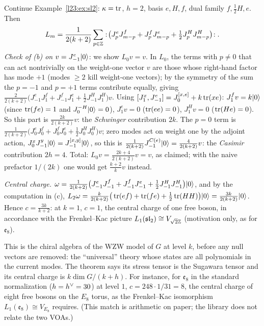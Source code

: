 \begin{example}\label{l23:ex:sl2sug}
Continue Example~\ref{l23:ex:sl2}: $\kappa=\operatorname{tr}$, $h=2$, basis $e,H,f$, dual family $f,\tfrac12H,e$. Then
\begin{equation*}
L_m=\frac{1}{2(k+2)}\sum_{p\in{\mathbb{Z}}}:\!\big(J^e_pJ^f_{m-p}+J^f_pJ^e_{m-p}+\tfrac12J^H_pJ^H_{m-p}\big)\!: .
\end{equation*}
\emph{Check of (b) on $v=J^e_{-1}|0\rangle$}: we show $L_0v=v$. In $L_0$, the terms with $p\neq0$ that can act nontrivially on the
weight-one vector $v$ are those whose right-hand factor has mode $+1$ (modes $\ge2$ kill weight-one vectors); by the symmetry of the sum
the $p=-1$ and $p=+1$ terms contribute equally, giving
$\frac{2}{2(k+2)}\big(J^e_{-1}J^f_1+J^f_{-1}J^e_1+\tfrac12J^H_{-1}J^H_1\big)v$. Using $[J^x_1,J^e_{-1}]=J^{[x,e]}_0+k\operatorname{tr}(xe)$:
$J^f_1v=k|0\rangle$ (since $\operatorname{tr}(fe)=1$ and $J^{-H}_0|0\rangle=0$), $J^e_1v=0$ ($\operatorname{tr}(ee)=0$), $J^H_1v=0$ ($\operatorname{tr}(He)=0$). So this part is
$\frac{2k}{2(k+2)}v$: the \emph{Schwinger} contribution $2k$. The $p=0$ term is
$\frac1{2(k+2)}\big(J^e_0J^f_0+J^f_0J^e_0+\tfrac12J^H_0J^H_0\big)v$; zero modes act on weight one by the adjoint action,
$J^x_0J^y_{-1}|0\rangle=J^{[x,y]}_{-1}|0\rangle$, so this is $\frac1{2(k+2)}J^{C(e)}_{-1}|0\rangle=\frac{4}{2(k+2)}v$: the
\emph{Casimir} contribution $2h=4$. Total: $L_0v=\frac{2k+4}{2(k+2)}v=v$, as claimed; with the naive prefactor $1/(2k)$ one would get
$\frac{k+2}{k}v$ instead.

\emph{Central charge.} $\omega=\frac1{2(k+2)}\big(J^e_{-1}J^f_{-1}+J^f_{-1}J^e_{-1}+\tfrac12J^H_{-1}J^H_{-1}\big)|0\rangle$, and by the
computation in (c), $L_2\omega=\frac{k}{2(k+2)}\big(\operatorname{tr}(ef)+\operatorname{tr}(fe)+\tfrac12\operatorname{tr}(HH)\big)|0\rangle=\frac{3k}{2(k+2)}|0\rangle$. Hence
$c=\frac{3k}{k+2}$: at $k=1$, $c=1$, the central charge of one free boson, in accordance with the Frenkel--Kac picture
$L_1(\mathfrak{sl}_2)\cong V_{\sqrt2{\mathbb{Z}}}$ (motivation only, as for $\mathfrak e_8$).
\end{example}

\begin{physics}
This is the chiral algebra of the WZW model of $G$ at level $k$, before any null vectors are removed: the ``universal''
theory whose states are all polynomials in the current modes. The theorem says its stress tensor is the Sugawara tensor
and its central charge is $k\dim G/(k+h)$. For instance, for $\mathfrak e_8$ in the standard normalization ($h=h^\vee=30$)
at level $1$, $c=248\cdot1/31=8$, the central charge of eight free bosons on the $E_8$ torus, as the Frenkel--Kac
isomorphism $L_1(\mathfrak e_8)\cong V_{E_8}$ requires. (This match is arithmetic on paper; the library does not relate the two VOAs.)
\end{physics}

